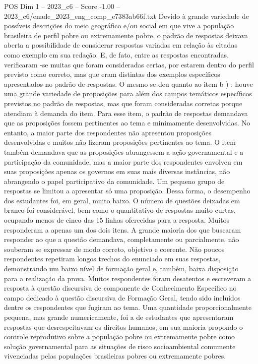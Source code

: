 \begin{textsample}{POS Dim 1 – 2023\_c6 – Score -1.00 – 2023\_c6/enade\_2023\_eng\_comp\_e7383ab66f.txt}
Devido à grande variedade de possíveis descrições do meio geográfico e/ou social em que vive a população brasileira de perfil pobre ou extremamente pobre, o padrão de respostas deixava aberta a possibilidade de considerar respostas variadas em relação às citadas como exemplo em sua redação.
E, de fato, entre as respostas encontradas, verificaram -se muitas que foram consideradas certas, por estarem dentro do perfil previsto como correto, mas que eram distintas dos exemplos específicos apresentados no padrão de respostas.
O mesmo se deu quanto ao item b ) : houve uma grande variedade de proposições para além dos campos temáticos específicos previstos no padrão de respostas, mas que foram consideradas corretas porque atendiam à demanda do item.
Para esse item, o padrão de respostas demandava que as proposições fossem pertinentes ao tema e minimamente desenvolvidas.
No entanto, a maior parte dos respondentes não apresentou proposições desenvolvidas e muitos não fizeram proposições pertinentes ao tema.
O item também demandava que as proposições abrangessem a ação governamental e a participação da comunidade, mas a maior parte dos respondentes envolveu em suas proposições apenas os governos em suas mais diversas instâncias, não abrangendo o papel participativo da comunidade.
Um pequeno grupo de respostas se limitou a apresentar só uma proposição.
Dessa forma, o desempenho dos estudantes foi, em geral, muito baixo.
O número de questões deixadas em branco foi considerável, bem como o quantitativo de respostas muito curtas, ocupando menos de cinco das 15 linhas oferecidas para a resposta.
Muitos responderam a apenas um dos dois itens.
A grande maioria dos que buscaram responder ao que a questão demandava, completamente ou parcialmente, não souberam se expressar de modo correto, objetivo e coerente.
Não poucos respondentes repetiram longos trechos do enunciado em suas respostas, demonstrando um baixo nível de formação geral e, também, baixa disposição para a realização da prova.
Muitos respondentes foram desatentos e escreveram a resposta à questão discursiva de componente de Conhecimento Específico no campo dedicado à questão discursiva de Formação Geral, tendo sido incluídos dentre os respondentes que fugiram ao tema.
Uma quantidade proporcionalmente pequena, mas grande numericamente, foi a de estudantes que apresentaram respostas que desrespeitavam os direitos humanos, em sua maioria propondo o controle reprodutivo sobre a população pobre ou extremamente pobre como solução governamental para as situações de risco socioambiental comumente vivenciadas pelas populações brasileiras pobres ou extremamente pobres.

\end{textsample}
